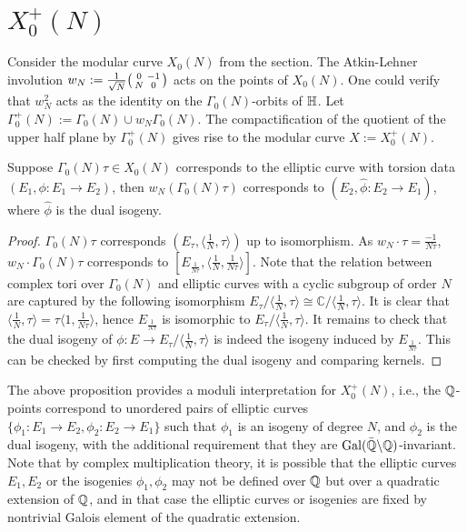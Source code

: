 \section{$X_0^+(N)$}

Consider the modular curve $X_0(N)$ from the section. The Atkin-Lehner involution $w_N := \frac{1}{\sqrt{N}} \begin{psmallmatrix} 0 & -1 \\ N & 0 \end{psmallmatrix}$ acts on the points of $X_0(N)$. One could verify that $w_N^2$ acts as the identity on the $\Gamma_0(N)$-orbits of $\mathbb{H}$. Let $\Gamma_0^+(N) := \Gamma_0(N) \cup w_N \Gamma_0(N)$. The compactification of the quotient of the upper half plane by $\Gamma_0^+(N)$ gives rise to the modular curve $X:=X_0^+(N)$.

\begin{proposition}\label{moduli_Nplus}
Suppose $\Gamma_0(N) \tau \in X_0(N)$ corresponds to the elliptic curve with torsion data $(E_1, \phi:E_1\rightarrow E_2)$, then $w_N(\Gamma_0(N) \tau )$  corresponds to $(E_2,\hat{\phi}:E_2\rightarrow E_1)$, where $\hat{\phi}$ is the dual isogeny.
\end{proposition}

\begin{proof}
$\Gamma_0(N)\tau$ corresponds $(E_\tau,\langle\frac{1}{N},\tau \rangle)$ up to isomorphism. As $w_N \cdot \tau = \frac{-1}{N\tau}$, $w_N\cdot \Gamma_0(N)\tau$ corresponds to $[E_{\frac{1}{N\tau}}, \langle\frac{1}{N}, \frac{1}{N\tau} \rangle]$. Note that the relation between complex tori over $\Gamma_0(N)$ and elliptic curves with a cyclic subgroup of order $N$ are captured by the following isomorphism $E_\tau/\langle\frac{1}{N},\tau\rangle \cong \mathbb{C}/\langle\frac{1}{N},\tau\rangle$. It is clear that  $\langle\frac{1}{N},\tau\rangle = \tau \langle 1,\frac{1}{N\tau}\rangle$, hence $E_{\frac{1}{N\tau}}$ is isomorphic to $E_\tau/\langle\frac{1}{N},\tau\rangle$. It remains to check that the dual isogeny of $\phi:E \rightarrow E_\tau/\langle\frac{1}{N},\tau\rangle$ is indeed the isogeny induced by $E_{\frac{1}{N\tau}}$. This can be checked by first computing the dual isogeny and comparing kernels.
\end{proof}

The above proposition provides a moduli interpretation for $X_0^+(N)$, i.e., the $\mathbb{Q}$-points correspond to unordered pairs of elliptic curves $\{\phi_1: E_1 \rightarrow E_2, \phi_2: E_2 \rightarrow E_1\}$ such that $\phi_1$ is an isogeny of degree $N$, and $\phi_2$ is the dual isogeny, with the additional requirement that they are $\operatorname{Gal}(\bar{\mathbb{Q}}\backslash \mathbb{Q})$-invariant. Note that by complex multiplication theory, it is possible that the elliptic curves $E_1,E_2$ or the isogenies $\phi_1,\phi_2$ may not be defined over $\mathbb{Q}$ but over a quadratic extension of $\mathbb{Q}$, and in that case the elliptic curves or isogenies are fixed by nontrivial Galois element of the quadratic extension.

